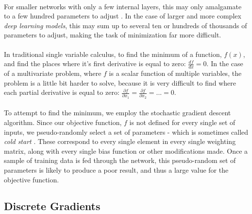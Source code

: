 \documentclass[12pt,letterpaper]{article}
\begin{document}
\paragraph*{}For smaller networks with only a few internal layers, this may only amalgamate to a few hundred parameters to adjust \cite{Goodfellow}. In the case of larger and more complex \textit{deep learning models}, this may sum up to several ten or hundreds of thousands of parameters to adjust, making the task of minimization far more difficult. 
\paragraph*{}In traditional single variable calculus, to find the minimum of a function, $f(x)$, and find the places where it's first derivative is equal to zero: $\frac{df}{dx} = 0$. In the case of a multivariate problem, where $f$ is a scalar function of multiple variables, the problem is a little bit harder to solve, because it is very difficult to find where each partial derivative is equal to zero: $\frac{\partial f}{\partial x_1} = \frac{\partial f}{\partial x_2} = ... = 0$.
\paragraph*{}To attempt to find the minimum, we employ the stochastic gradient descent algorithm. Since our objective function, $f$ is not defined for every single set of inputs, we pseudo-randomly select a set of parameters - which is sometimes called \textit{cold start} \cite{Goodfellow}. These correspond to every single element in every single weighting matrix, along with every single bias function or other modifications made. Once a sample of training data is fed through the network, this pseudo-random set of parameters is likely to produce a poor result, and thus a large value for the objective function.


\subsection{Discrete Gradients}






\end{document}
